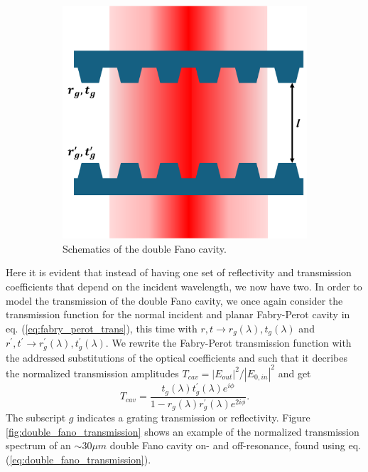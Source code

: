 \begin{figure}[h!]
\begin{subfigure}[b]{0.3\textwidth}
        \includegraphics[width=\textwidth]{figures/double_fano_sketch.pdf}
        \caption{Schematics of the double Fano cavity.}
        \label{fig:double_fano_sketch}
    \end{subfigure}
    \caption{}
    \label{fig:single_and_double_fano_sketch}
\end{figure}

Here it is evident that instead of having one set of reflectivity and transmission coefficients that depend on the incident wavelength, we now have two. In order to model the transmission of the double Fano cavity, we once again consider the transmission function for the normal incident and planar Fabry-Perot cavity in eq. (\ref{eq:fabry_perot_trans}), this time with $r,t \rightarrow r_g(\lambda),t_g(\lambda)$ and $r^{\prime},t^{\prime} \rightarrow r_g^{\prime}(\lambda),t_g^{\prime}(\lambda)$. We rewrite the Fabry-Perot transmission function with the addressed substitutions of the optical coefficients and such that it decribes the normalized transmission amplitudes $T_{cav} = |E_{out}|^2/|E_{0,in}|^2$ and get
\begin{equation}
    T_{cav} = \frac{t_g(\lambda) t_g^{\prime}(\lambda) e^{i\phi}}{1 - r_g(\lambda)r_g^{\prime}(\lambda) e^{2 i \phi}}.
    \label{eq:double_fano_transmission}
\end{equation}
The subscript $g$ indicates a grating transmission or reflectivity. Figure \ref{fig:double_fano_transmission} shows an example of the normalized transmission spectrum of an $\sim 30 \mu m$ double Fano cavity on- and off-resonance, found using eq. (\ref{eq:double_fano_transmission}).

